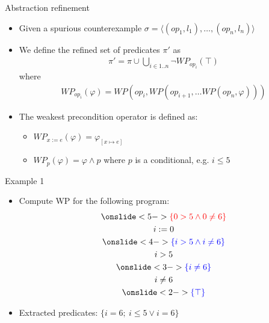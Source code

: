 
\begin{frame}{Abstraction refinement}
\begin{itemize}
  \itemsep 0.3cm 
  \item Given a spurious counterexample $\sigma = \langle (op_1, l_1), \ldots,
  (op_n, l_n) \rangle$
  
  \item We define the refined set of predicates $\pi'$ as
  \begin{align*}
  \pi' = \pi \cup \bigcup_{i \in 1..n} \neg WP_{op_i}(\top) 
  \end{align*}  
  where
  \begin{align*}
  WP_{op_i}(\varphi) = WP(op_i, WP(op_{i + 1}, \ldots WP(op_n, \varphi))) 
  \end{align*}
  \item The weakest precondition operator is defined as:
      \begin{itemize}
      \itemsep 0.2cm 
      \item $WP_{x := e}(\varphi) = \varphi_{[x \mapsto e ]}$
      \item $WP_{p}(\varphi) = \varphi \wedge p$ where $p$ is a conditional, e.g. $i \leq 5$
    \end{itemize}    
\end{itemize}
\end{frame}


\begin{frame}{Example 1}


\begin{itemize}
  
  \item Compute WP for the following program: 
  \begin{gather*} 
  \onslide<5->{{\color{red} \{0 > 5 \wedge 0 \neq 6\}} } \\
  i := 0 \\
  \onslide<4->{ {\color{blue} \{ i > 5 \wedge i \neq 6 \} } }
  \\
  i > 5 \\
  \onslide<3->{ {\color{blue} \{ i \neq 6 \}} }
  \\
  i \neq 6 \\
  \onslide<2->{ {\color{blue} \{ \top \}} }
  \end{gather*}
  
  \item<5-> Extracted predicates: $\{ i = 6; \ i \leq 5 \vee i = 6 \}$
\end{itemize}
\end{frame}


